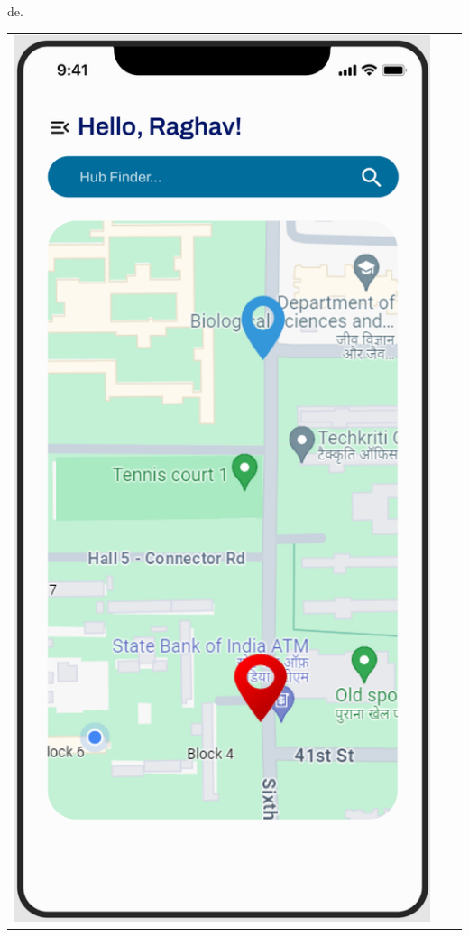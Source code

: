 de.
\begin{center}
\begin{tabular}{ccc}
    \includegraphics[scale=0.1]{ui-images/Dashboard.png} &

\end{tabular}
\end{center}
